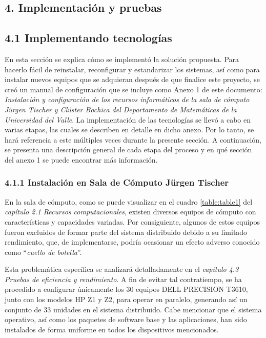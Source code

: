\begin{spacing}{1.5}
  \begin{tightcenter}
    \section{4. Implementación y pruebas}
    \mylinespacing
  \end{tightcenter}

  \subsection{4.1 Implementando tecnologías}

  En esta sección se explica cómo se implementó la solución propuesta. Para hacerlo fácil de reinstalar, reconfigurar y estandarizar los sistemas, así como para instalar nuevos equipos que se adquieran después de que finalice este proyecto, se creó un manual de configuración que se incluye como Anexo 1 de este documento: \textit{Instalación y configuración de los recursos informáticos de la sala de cómputo Jürgen Tischer y Clúster Bochica del Departamento de Matemáticas de la Universidad del Valle}. La implementación de las tecnologías se llevó a cabo en varias etapas, las cuales se describen en detalle en dicho anexo. Por lo tanto, se hará referencia a este múltiples veces durante la presente sección. A continuación, se presenta una descripción general de cada etapa del proceso y en qué sección del anexo 1 se puede encontrar más información.

  \subsubsection{4.1.1 Instalación en Sala de Cómputo Jürgen Tischer}

  En la sala de cómputo, como se puede visualizar en el cuadro \ref{table:table1} del \textit{capítulo 2.1 Recursos computacionales}, existen diversos equipos de cómputo con características y capacidades variadas. Por consiguiente, algunos de estos equipos fueron excluidos de formar parte del sistema distribuido debido a su limitado rendimiento, que, de implementarse, podría ocasionar un efecto adverso conocido como ``\textit{cuello de botella}''.

  Esta problemática específica se analizará detalladamente en el \textit{capítulo 4.3 Pruebas de eficiencia y rendimiento}. A fin de evitar tal contratiempo, se ha procedido a configurar únicamente los 30 equipos DELL PRECISION T3610, junto con los modelos HP Z1 y Z2, para operar en paralelo, generando así un conjunto de 33 unidades en el sistema distribuido. Cabe mencionar que el sistema operativo, así como los paquetes de software base y las aplicaciones, han sido instalados de forma uniforme en todos los dispositivos mencionados.


\end{spacing}
